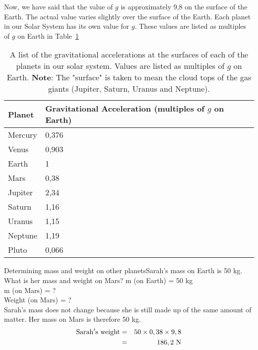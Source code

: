 Now, we have said that the value of $g$ is approximately 9,8 \mss on the surface of the Earth. The actual value varies slightly over the surface of the Earth. 
Each planet in our Solar System has its own value for $g$. These values are listed as multiples of $g$ on Earth in Table~\ref{tab:pg:gravityplanets}

\begin{table}[htb]
\begin{center}
\begin{tabular}{|p{2cm}|p{4cm}|}\hline
\textbf{Planet} & Gravitational Acceleration (multiples of $g$ on Earth)\\\hline
Mercury & 0,376 \\\hline
Venus & 0,903 \\\hline
Earth & 1 \\\hline
Mars & 0,38 \\\hline
Jupiter & 2,34 \\\hline
Saturn & 1,16 \\\hline
Uranus & 1,15 \\\hline
Neptune & 1,19 \\\hline
Pluto & 0,066 \\\hline
\end{tabular}
\caption{A list of the gravitational accelerations at the surfaces of each of the planets in our solar system. Values are listed as multiples of $g$ on Earth. \textbf{Note}: The "surface" is taken to mean the cloud tops of the gas giants (Jupiter, Saturn, Uranus and Neptune).}
\label{tab:pg:gravityplanets}
\end{center}
\end{table}

\begin{wex}
{Determining mass and weight on other planets}{Sarah's mass on Earth is 50 kg. What is her mass and weight on Mars?}
{
m (on Earth) = 50 kg \\
m (on Mars) = ? \\
Weight (on Mars) = ?\\
Sarah's mass does not change because she is still made up of the same amount of matter. Her mass on Mars is therefore 50 kg. \\
\begin{eqnarray*}
\rm{Sarah's~weight} &=& 50 \times 0,38 \times 9,8\\
&=& 186,2~\rm{N}
\end{eqnarray*}}
\end{wex}

